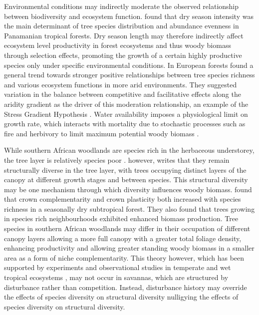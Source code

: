 \documentclass[11pt,a4paper]{article}
\begin{document}
Environmental conditions may indirectly moderate the observed relationship between biodiversity and ecosystem function. \citet{Condit2013} found that dry season intensity was the main determinant of tree species distribution and abundance evenness in Panamanian tropical forests. Dry season length may therefore indirectly affect ecosystem level productivity in forest ecosystems and thus woody biomass through selection effects, promoting the growth of a certain highly productive species only under specific environmental conditions. In European forests \citep{Ratcliffe2017} found a general trend towards stronger positive relationships between tree species richness and various ecosystem functions in more arid environments. They suggested variation in the balance between competitive and facilitative effects along the aridity gradient as the driver of this moderation relationship, an example of the Stress Gradient Hypothesis \citep{Dohn2013}. Water availability imposes a physiological limit on growth rate, which interacts with mortality due to stochastic processes such as fire and herbivory to limit maximum potential woody biomass \citep{}. 


While southern African woodlands are species rich in the herbaceous understorey, the tree layer is relatively species poor \citep{}. \citet{Solbrig1996} however, writes that they remain structurally diverse in the tree layer, with trees occupying distinct layers of the canopy at different growth stages and between species. This structural diversity may be one mechanism through which diversity influences woody biomass. \citep{Kunz2019} found that crown complementarity and crown plasticity both increased with species richness in a seasonally dry subtropical forest. They also found that trees growing in species rich neighbourhoods exhibited enhanced biomass production. Tree species in southern African woodlands may differ in their occupation of different canopy layers allowing a more full canopy with a greater total foliage density, enhancing productivity and allowing greater standing woody biomass in a smaller area as a form of niche complementarity. This theory however, which has been supported by experiments and observational studies in temperate and wet tropical ecosystems \citep{}, may not occur in savannas, which are structured by disturbance rather than competition. Instead, disturbance history may override the effects of species diversity on structural diversity nulligying the effects of species diversity on structural diversity.
\end{document}
